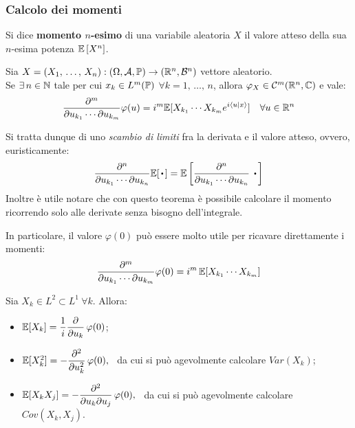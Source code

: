 \subsubsection{Calcolo dei momenti}

\begin{defn}
  Si dice \textbf{momento $n$-esimo} di una variabile aleatoria $X$ il valore atteso della sua $n$-esima potenza $\mathbb E \left[ X^n \right]$. \\
\end{defn}

\smallskip
\begin{teob}[\JPTh{13.2}]
  Sia $X=(X_1, \, \dots, \, X_n):\DoCo$ vettore aleatorio. \\
  Se $\exists \, n \in \mathbb N$ tale per cui $x_k \in L^m (\mathbb P)$ $\forall k=1, \, \dots, \, n$, allora $\varphi_X\in \mathcal C^m(\mathbb R^n,\mathbb C)$ e vale:
    $$\frac{\partial^m}{\partial u_{k_1} \cdots \partial u_{k_m}}\varphi(u)=i^m\mathbb E[X_{k_1} \cdots X_{k_m}e^{i \langle u|x\rangle}] \quad \forall u \in \mathbb R^n$$
\end{teob}

Si tratta dunque di uno \emph{scambio di limiti} fra la derivata e il valore atteso, ovvero, euristicamente:
$$\frac{\partial^n}{\partial u_{k_1} \cdots \partial u_{k_n}}\EE[\, \bigcdot \,]=\EE\left[\frac{\partial^n}{\partial u_{k_1} \cdots \partial u_{k_n}} \; \, \bigcdot \, \right] $$
Inoltre è utile notare che con questo teorema è possibile calcolare il momento ricorrendo solo alle derivate senza bisogno dell'integrale.

\begin{oss}\label{oss-momenti}
  In particolare, il valore $\varphi(0)$ può essere molto utile per ricavare direttamente i momenti:
  $$\frac{\partial^m}{\partial u_{k_1} \cdots \partial u_{k_m}}\varphi(0)=i^m \, \mathbb E[X_{k_1} \cdots X_{k_m}]$$
\end{oss}
\medskip
\begin{oss}
  Sia $X_k \in L^2 \subset L^1 \ \forall k$. Allora:
  \begin{itemize}
    \item $\mathbb E[X_k]=\dfrac{1}{i}\dfrac{\partial}{\partial u_k}\,\varphi(0)$;
    \item $ \mathbb E[X_k^2]=-\dfrac{\partial^2}{\partial u_k^2}\,\varphi(0),\enspace$ da cui si può agevolmente calcolare $Var(X_k)$;
    \item $ \mathbb E[X_kX_j]=-\dfrac{\partial^2}{\partial u_k \partial u_j}\,\varphi(0), \enspace$ da cui si può agevolmente calcolare $Cov(X_k,X_j)$.
  \end{itemize}
\end{oss}



